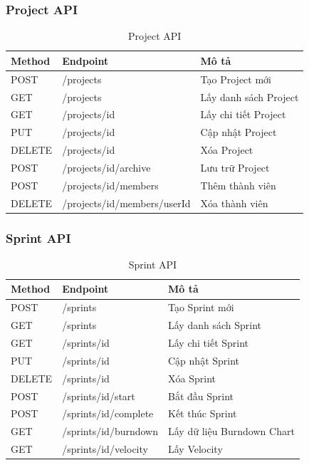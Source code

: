 \documentclass[12pt,a4paper]{report}
\begin{document}
\subsubsection{Project API}

\begin{table}[H]
\centering
\caption{Project API}
\begin{tabular}{|p{2.5cm}|p{4cm}|p{8cm}|}
\hline
\textbf{Method} & \textbf{Endpoint} & \textbf{Mô tả} \\
\hline
POST & /projects & Tạo Project mới \\
\hline
GET & /projects & Lấy danh sách Project \\
\hline
GET & /projects/{id} & Lấy chi tiết Project \\
\hline
PUT & /projects/{id} & Cập nhật Project \\
\hline
DELETE & /projects/{id} & Xóa Project \\
\hline
POST & /projects/{id}/archive & Lưu trữ Project \\
\hline
POST & /projects/{id}/members & Thêm thành viên \\
\hline
DELETE & /projects/{id}/members/{userId} & Xóa thành viên \\
\hline
\end{tabular}
\label{tab:project_api}
\end{table}

\subsubsection{Sprint API}

\begin{table}[H]
\centering
\caption{Sprint API}
\begin{tabular}{|p{2.5cm}|p{4cm}|p{8cm}|}
\hline
\textbf{Method} & \textbf{Endpoint} & \textbf{Mô tả} \\
\hline
POST & /sprints & Tạo Sprint mới \\
\hline
GET & /sprints & Lấy danh sách Sprint \\
\hline
GET & /sprints/{id} & Lấy chi tiết Sprint \\
\hline
PUT & /sprints/{id} & Cập nhật Sprint \\
\hline
DELETE & /sprints/{id} & Xóa Sprint \\
\hline
POST & /sprints/{id}/start & Bắt đầu Sprint \\
\hline
POST & /sprints/{id}/complete & Kết thúc Sprint \\
\hline
GET & /sprints/{id}/burndown & Lấy dữ liệu Burndown Chart \\
\hline
GET & /sprints/{id}/velocity & Lấy Velocity \\
\hline
\end{tabular}
\label{tab:sprint_api}
\end{table}
\end{document}

